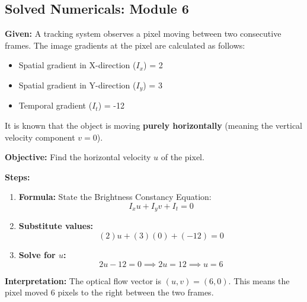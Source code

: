 \documentclass[11pt,a4paper]{article}
\begin{document}
\subsection{Solved Numericals: Module 6}

\begin{tcolorbox}[colback=orange!5!white,colframe=orange!75!black,title=\textbf{Numerical 1: Optical Flow (Brightness Constancy)}]
\textbf{Given:}
A tracking system observes a pixel moving between two consecutive frames. The image gradients at the pixel are calculated as follows:
\begin{itemize}
    \item Spatial gradient in X-direction ($I_x$) = 2
    \item Spatial gradient in Y-direction ($I_y$) = 3
    \item Temporal gradient ($I_t$) = -12
\end{itemize}
It is known that the object is moving \textbf{purely horizontally} (meaning the vertical velocity component $v = 0$).

\textbf{Objective:} Find the horizontal velocity $u$ of the pixel.

\textbf{Steps:}
\begin{enumerate}
    \item \textbf{Formula:} State the Brightness Constancy Equation:
    \[ I_x u + I_y v + I_t = 0 \]
    \item \textbf{Substitute values:}
    \[ (2)u + (3)(0) + (-12) = 0 \]
    \item \textbf{Solve for $u$:}
    \[ 2u - 12 = 0 \implies 2u = 12 \implies u = 6 \]
\end{enumerate}

\textbf{Interpretation:} The optical flow vector is $(u,v) = (6, 0)$. This means the pixel moved 6 pixels to the right between the two frames.
\end{tcolorbox}

\vspace{1em}
\end{document}
